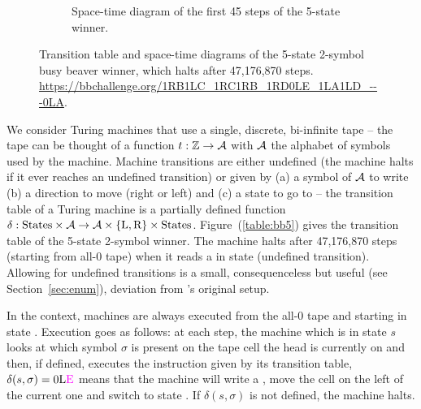\begin{figure}[h!]
\begin{subfigure}[t]{0.45\textwidth}
        \caption{Space-time diagram of the first 45 steps of the 5-state winner.}
        \label{fig:bb5-diagram}
    \end{subfigure}
    \caption{Transition table and space-time diagrams of the 5-state 2-symbol busy beaver winner, which halts after 47,176,870 steps.
        \url{https://bbchallenge.org/1RB1LC_1RC1RB_1RD0LE_1LA1LD_---0LA}.}
    \label{fig:bb5}
\end{figure}


We consider Turing machines that use a single, discrete, bi-infinite tape -- \ie the tape can be thought of a function $t: \mathbb{Z} \to \mathcal{A}$ with $\mathcal{A}$ the alphabet of symbols used by the machine. Machine transitions are either undefined (the machine halts if it ever reaches an undefined transition) or given by (a) a symbol of $\mathcal{A}$ to write (b) a direction to move (right or left) and (c) a state to go to -- \ie the transition table of a Turing machine is a partially defined function $\delta: \text{States} \times \mathcal{A} \to \mathcal{A} \times \{\text{L},\text{R}\} \times \text{States}$. Figure~(\ref{table:bb5}) gives the transition table of the 5-state 2-symbol \BBfull winner. The machine halts after 47,176,870 steps (starting from all-0 tape) when it reads a \szero in state \stateE (undefined transition). Allowing for undefined transitions is a small, consequenceless but useful (see Section~\ref{sec:enum}), deviation from \rado's original setup.

In the \BBfull context, machines are always executed from the all-0 tape and starting in state \stateA. Execution goes as follows: at each step, the machine which is in state $s$ looks at which symbol $\sigma$ is present on the tape cell the head is currently on and then, if defined, executes the instruction given by its transition table, \eg $\delta(s, \sigma) = 0\text{L}\text{\stateE}$ means that the machine will write a \szero, move the cell on the left of the current one and switch to state \stateE. If $\delta(s, \sigma)$ is not defined, the machine halts.



